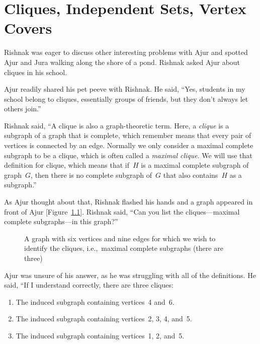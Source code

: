 \chapter{Cliques, Independent Sets, Vertex Covers}
Rishnak was eager to discuss other interesting problems with Ajur and spotted Ajur and Jura walking along the shore of a pond. Rishnak asked Ajur about cliques in his school.

Ajur readily shared his pet peeve with Rishnak. He said, ``Yes, students in my school belong to cliques, essentially groups of friends, but they don't always let others join.''

Rishnak said, ``A clique is also a graph-theoretic term. Here, a \textit{clique} is a subgraph of a graph that is complete, which remember means that every pair of vertices is connected by an edge. Normally we only consider a maximal complete subgraph to be a clique, which is often called a \textit{maximal clique}. We will use that definition for clique, which means that if~$H$ is a maximal complete subgraph of graph~$G$, then there is no complete subgraph of~$G$ that also contains~$H$ as a subgraph.''

As Ajur thought about that, Rishnak flashed his hands and a graph appeared in front of Ajur [Figure~\ref{13g1}]. Rishnak said, ``Can you list the cliques---maximal complete subgraphs---in this graph?''

\begin{figure}
\begin{center}
\caption{A graph with six vertices and nine edges for which we wish to identify the cliques, i.e.,~maximal complete subgraphs (there are three)}\label{13g1}
\end{center}
\end{figure}

Ajur was unsure of his answer, as he was struggling with all of the definitions. He said, ``If I understand correctly, there are three cliques:
\begin{enumerate}
    \item The induced subgraph containing vertices~4 and~6.
    \item The induced subgraph containing vertices~2, 3, 4, and~5.
    \item The induced subgraph containing vertices~1, 2, and~5.
\end{enumerate} 


